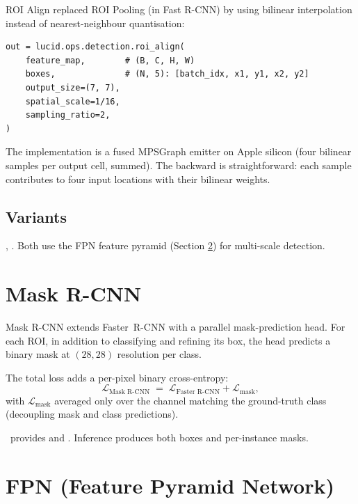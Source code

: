 ROI Align replaced ROI Pooling (in Fast R-CNN) by using bilinear
interpolation instead of nearest-neighbour quantisation:

\begin{lstlisting}[style=lucid,language=LucidPython]
out = lucid.ops.detection.roi_align(
    feature_map,        # (B, C, H, W)
    boxes,              # (N, 5): [batch_idx, x1, y1, x2, y2]
    output_size=(7, 7),
    spatial_scale=1/16,
    sampling_ratio=2,
)
\end{lstlisting}

The implementation is a fused MPSGraph emitter on Apple silicon
(four bilinear samples per output cell, summed). The backward
is straightforward: each sample contributes to four input
locations with their bilinear weights.

\subsection{Variants}
\label{ssec:detection_segmentation:faster_rcnn_variants}

,
. Both use the FPN
\cite{lin_fpn_2017} feature pyramid (Section
\ref{sec:detection_segmentation:fpn}) for multi-scale detection.

\section{Mask R-CNN}
\label{sec:detection_segmentation:mask_rcnn}

Mask R-CNN \cite{he_mask_rcnn_2017} extends Faster~R-CNN with a
parallel mask-prediction head. For each ROI, in addition to
classifying and refining its box, the head predicts a binary
mask at $(28, 28)$ resolution per class.

The total loss adds a per-pixel binary cross-entropy:
\[
  \mathcal{L}_{\text{Mask R-CNN}} \;=\;
  \mathcal{L}_{\text{Faster R-CNN}}
  + \mathcal{L}_{\text{mask}},
\]
with $\mathcal{L}_{\text{mask}}$ averaged only over the channel
matching the ground-truth class (decoupling mask and class
predictions).

\Lucid\ provides  and
. Inference produces both
boxes and per-instance masks.

\section{FPN (Feature Pyramid Network)}
\label{sec:detection_segmentation:fpn}

